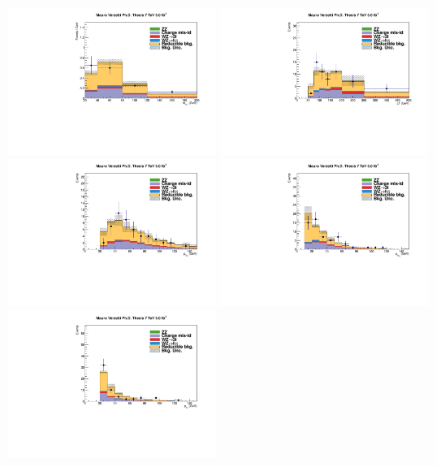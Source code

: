 \begin{figure}
\begin{center}
  \includegraphics[width=0.49\textwidth]{4_Analisys/pics/7TeV/plots/eet/f3/Full/final-f3-subMass-Full.pdf}
  \includegraphics[width=0.49\textwidth]{4_Analisys/pics/7TeV/plots/eet/f3/final-f3-LT.pdf}\\
  \includegraphics[width=0.49\textwidth]{4_Analisys/pics/7TeV/plots/eet/f3/Full/final-f3-e1Pt-Full.pdf}
  \includegraphics[width=0.49\textwidth]{4_Analisys/pics/7TeV/plots/eet/f3/Full/final-f3-e2Pt-Full.pdf}\\
  \includegraphics[width=0.49\textwidth]{4_Analisys/pics/7TeV/plots/eet/f3/Full/final-f3-tPt-Full.pdf}

\end{center}
\end{figure}
